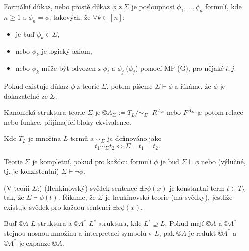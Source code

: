 \documentclass[12pt]{article}                   %
\begin{document}
        \begin{definice}
            Formální důkaz, nebo prostě důkaz $\phi$ z $\Sigma$ je posloupnost $\phi_1, …, \phi_n$ formulí, kde $n ≥ 1$ a $\phi_n = \phi$, takových, že $\forall k \in [n]$:

            \begin{itemize}
                \item je buď $\phi_k \in \Sigma$,
                \item nebo $\phi_k$ je logický axiom,
                \item nebo $\phi_k$ může být odvozen z $\phi_i$ a $\phi_j$ ($\phi_j$) pomocí MP (G), pro nějaké $i, j$.
            \end{itemize}

            Pokud existuje důkaz $\phi$ z teorie $\Sigma$, potom píšeme $\Sigma \vdash \phi$ a říkáme, že $\phi$ je dokazatelné ze $\Sigma$.
        \end{definice}

        \begin{definice}
            Kanonická struktura teorie $\Sigma$ je $©A_\Sigma := T_L/\sim_\Sigma$. $R^{A_\Sigma}$ nebo $F^{A_\Sigma}$ je potom relace nebo funkce, přijímající bloky ekvivalence.

            Kde $T_L$ je množina $L$-termů a $\sim_\Sigma$ je definováno jako
            $$ t_1 \sim_\Sigma t_2 \Leftrightarrow \Sigma \vdash t_1 = t_2. $$
        \end{definice}

        \begin{definice}
            Teorie $\Sigma$ je kompletní, pokud pro každou formuli $\phi$ je buď $\Sigma \vdash \phi$ nebo (výlučné, tj. je konzistentní) $\Sigma \vdash \neg\phi$.
        \end{definice}

        \begin{definice}
            (V teorii $\Sigma$:) (Henkinovský) svědek sentence $\exists x \phi(x)$ je konstantní term $t \in T_L$ tak, že $\Sigma \vdash \phi(t)$. Říkáme, že $\Sigma$ je henkinovská teorie (má svědky), jestliže existuje svědek pro každou sentenci $\exists x \phi(x)$.
        \end{definice}

        \begin{definice}
            Buď $©A$ $L$-struktura a $©A^*$ $L^*$-struktura, kde $L^* \supseteq L$. Pokud mají $©A$ a $©A^*$ stejnou nosnou množinu a interpretaci symbolů v $L$, pak $©A$ je redukt $©A^*$ a $©A^*$ je expanze $©A$.
        \end{definice}
\end{document}
